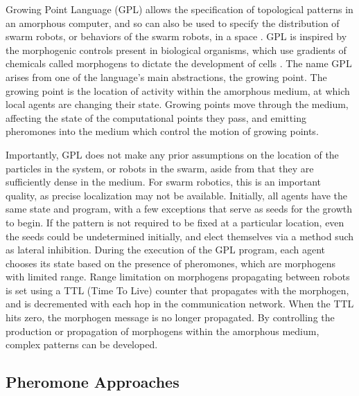 Growing Point Language (GPL) allows the specification of topological patterns in an amorphous computer, and so can also be used to specify the distribution of swarm robots, or behaviors of the swarm robots, in a space \citep{nagpal2004engineering}. 
GPL is inspired by the morphogenic controls present in biological organisms, which use gradients of chemicals called morphogens to dictate the development of cells \citep{turing1952chemical}.
The name GPL arises from one of the language's main abstractions, the growing point. 
The growing point is the location of activity within the amorphous medium, at which local agents are changing their state. 
Growing points move through the medium, affecting the state of the computational points they pass, and emitting pheromones into the medium which control the motion of growing points.

Importantly, GPL does not make any prior assumptions on the location of the particles in the system, or robots in the swarm, aside from that they are sufficiently dense in the medium. 
For swarm robotics, this is an important quality, as precise localization may not be available. 
Initially, all agents have the same state and program, with a few exceptions that serve as seeds for the growth to begin. 
If the pattern is not required to be fixed at a particular location, even the seeds could be undetermined initially, and elect themselves via a method such as lateral inhibition. 
During the execution of the GPL program, each agent chooses its state based on the presence of pheromones, which are morphogens with limited range. 
Range limitation on morphogens propagating between robots is set using a TTL (Time To Live) counter that propagates with the morphogen, and is decremented with each hop in the communication network. 
When the TTL hits zero, the morphogen message is no longer propagated. 
By controlling the production or propagation of morphogens within the amorphous medium, complex patterns can be developed. 

\subsection{Pheromone Approaches}


